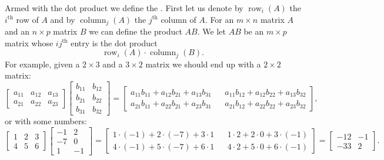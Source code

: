 Armed with the dot product we define the
\emph{}.
First let us denote by $\operatorname{row}_i(A)$ the $i^{\text{th}}$ row
of $A$ and by
$\operatorname{column}_j(A)$ the $j^{\text{th}}$ column of $A$.
For an $m \times n$ matrix $A$ and an $n \times p$ matrix $B$
we can define the product $AB$.  We let $AB$ be an $m \times p$
matrix whose $ij^{\text{th}}$ entry is the dot product
\begin{equation*}
\operatorname{row}_i(A) \cdot
\operatorname{column}_j(B) .
\end{equation*}
For example, given a $2 \times 3$ and a $3 \times 2$ matrix
we should end up with a $2 \times 2$ matrix:
\begin{equation} \label{linalg:eqmatrixmulex}
\begin{bmatrix}
a_{11} & a_{12} & a_{13} \\
a_{21} & a_{22} & a_{23}
\end{bmatrix}
\begin{bmatrix}
b_{11} & b_{12} \\
b_{21} & b_{22} \\
b_{31} & b_{32}
\end{bmatrix}
=
\begin{bmatrix}
a_{11} b_{11} + 
a_{12} b_{21} + 
a_{13} b_{31} & &
a_{11} b_{12} + 
a_{12} b_{22} + 
a_{13} b_{32} \\
a_{21} b_{11} + 
a_{22} b_{21} + 
a_{23} b_{31} & &
a_{21} b_{12} + 
a_{22} b_{22} + 
a_{23} b_{32}
\end{bmatrix} ,
\end{equation}
or with some numbers:
\begin{equation*}
\begin{bmatrix}
1 & 2 & 3 \\
4 & 5 & 6
\end{bmatrix}
\begin{bmatrix}
-1 & 2 \\
-7 & 0 \\
1 & -1
\end{bmatrix}
=
\begin{bmatrix}
1\cdot (-1) + 2\cdot (-7) + 3 \cdot 1 &  &
1\cdot 2 + 2\cdot 0 + 3 \cdot (-1) \\
4\cdot (-1) + 5\cdot (-7) + 6 \cdot 1 &  &
4\cdot 2 + 5\cdot 0 + 6 \cdot (-1)
\end{bmatrix}
=
\begin{bmatrix}
-12 & -1 \\
-33 & 2
\end{bmatrix} .
\end{equation*}

